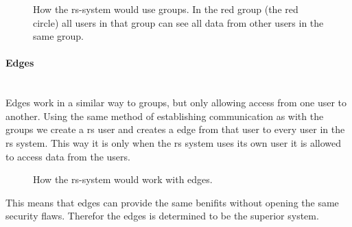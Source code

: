 \begin{figure}[h]
	\centering
	\label{fig:astepgroup}
	\caption{How the \gls{rs}-system would use groups. In the red group (the red circle) all users in that group can see all data from other users in the same group.}
\end{figure}

\paragraph{Edges}\\ 
Edges work in a similar way to groups, but only allowing access from one user to another.
Using the same method of establishing communication as with the groups we create a \gls{rs} user and creates a edge from that user to every user in the \gls{rs} system.
This way it is only when the \gls{rs} system uses its own user it is allowed to access data from the users.

\begin{figure}[h]
	\centering
	\label{fig:astepgroup}
	\caption{How the \gls{rs}-system would work with edges.}
\end{figure}

This means that edges can provide the same benifits without opening the same security flaws.
Therefor the edges is determined to be the superior system.

